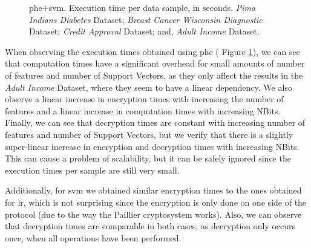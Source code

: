 \begin{figure}[hpt]
\caption[\acs{phe}+\acs{svm}. Execution time per data sample, in seconds. All datasets.]{\acs{phe}+\acs{svm}. Execution time per data sample, in seconds.
 \emph{Pima Indians Diabetes} Dataset;
 \emph{Breast Cancer Wisconsin Diagnostic} Dataset;
 \emph{Credit Approval} Dataset; and,
 \emph{Adult Income} Dataset.}%
\label{fig:svm-phe}%
\end{figure}



When observing the execution times obtained using \ac{phe} (
Figure \ref{fig:svm-phe}), we can see that computation times have a significant overhead for small amounts of number of features and number of Support Vectors, as they only affect the results in the \emph{Adult Income} Dataset, where they seem to have a linear dependency. 
We also observe a linear increase in encryption times with increasing the number of features and a linear increase in computation times with increasing NBits.
Finally, we can see that decryption times are constant with increasing number of features and number of Support Vectors, but we verify that there is a slightly super-linear increase in encryption and decryption times with increasing NBits. This can cause a problem of scalability, but it can be safely ignored since the execution times per sample are still very small.

Additionally, for \ac{svm} we obtained similar encryption times to the ones obtained for \ac{lr}, which is not surprising since the encryption is only done on one side of the protocol (due to the way the Paillier cryptosystem works). Also, we can observe that decryption times are comparable in both cases, as decryption only occurs once, when all operations have been performed.



